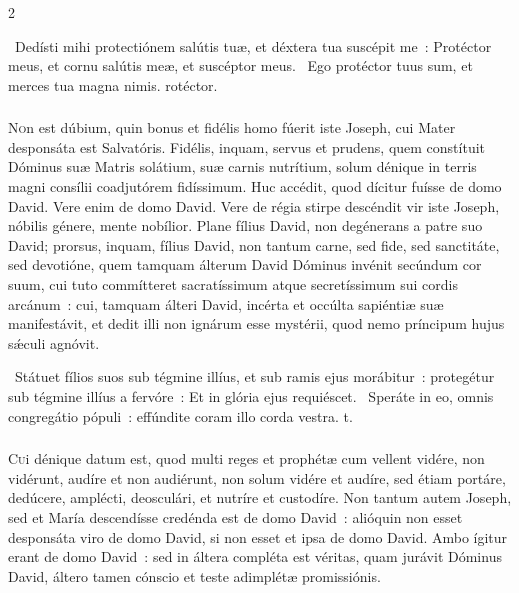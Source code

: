 \documentclass[9pt,twoside]{extarticle}
\begin{document}
\begin{multicols}{2}
{\begin{tightlist}{}
\item {}~Dedísti mihi protectiónem salútis tuæ, et déxtera tua suscépit me~: \textred{*} Protéctor meus, et cornu salútis meæ, et suscéptor meus. ~Ego protéctor tuus sum, et merces tua magna nimis. rotéctor.
\end{tightlist}

\subsubsection*{\center {}}
\lettrine{N}on est dúbium, quin bonus et fidélis homo fúerit iste Joseph, cui Mater desponsáta est Salvatóris. Fidélis, inquam, servus et prudens, quem constítuit Dóminus suæ Matris solátium, suæ carnis nutrítium, solum dénique in terris magni consílii coadjutórem fidíssimum. Huc accédit, quod dícitur fuísse de domo David. Vere enim de domo David. Vere de régia stirpe descéndit vir iste Joseph, nóbilis génere, mente nobílior. Plane fílius David, non degénerans a patre suo David; prorsus, inquam, fílius David, non tantum carne, sed fide, sed sanctitáte, sed devotióne, quem tamquam álterum David Dóminus invénit secúndum cor suum, cui tuto commítteret sacratíssimum atque secretíssimum sui cordis arcánum~: cui, tamquam álteri David, incérta et occúlta sapiéntiæ suæ manifestávit, et dedit illi non ignárum esse mystérii, quod nemo príncipum hujus sǽculi agnóvit.

\begin{tightlist}{}
\item {}~Státuet fílios suos sub tégmine illíus, et sub ramis ejus morábitur~: protegétur sub tégmine illíus a fervóre~: \textred{*} Et in glória ejus requiéscet. ~Speráte in eo, omnis congregátio pópuli~: effúndite coram illo corda vestra. t.
\end{tightlist}

\subsubsection*{\center {}}
\lettrine{C}ui dénique datum est, quod multi reges et prophétæ cum vellent vidére, non vidérunt, audíre et non audiérunt, non solum vidére et audíre, sed étiam portáre, dedúcere, amplécti, deosculári, et nutríre et custodíre. Non tantum autem Joseph, sed et María descendísse credénda est de domo David~: alióquin non esset desponsáta viro de domo David, si non esset et ipsa de domo David. Ambo ígitur erant de domo David~: sed in áltera compléta est véritas, quam jurávit Dóminus David, áltero tamen cónscio et teste adimplétæ promissiónis.

}
\end{multicols}
\end{document}
